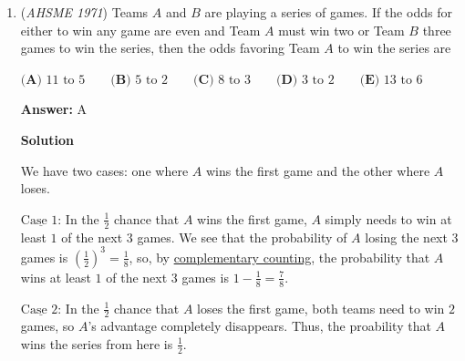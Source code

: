 \begin{enumerate}
 



\textbf{Solution 2 (not recommended)}

Suppose $w=e^{i\frac{2\pi}3}=\cos(\frac{2\pi}3)+i\sin(\frac{2\pi}3) = \frac{-1+i\sqrt3}2$. Substituting this into the given expression, we can calculate the result:\begin{align*}(1-w+w^2)(1+w-w^2) &= (1-\frac{-1+i\sqrt3}2+(\frac{-1+i\sqrt3}2)^2)(1+\frac{-1+i\sqrt3}2-(\frac{-1+i\sqrt3}2)^2) \\&= (1-\frac{-1+i\sqrt3}{2}+\frac{1-3-2i\sqrt3}{4})(1+\frac{-1+i\sqrt3}2-\frac{1-3-2i\sqrt3}{4}) \\&= (1-\frac{-1+i\sqrt3}{2}+\frac{-1-i\sqrt3}{2})(1+\frac{-1+i\sqrt3}2-\frac{-1-i\sqrt3}{2}) \\&= (1-2(\frac{i\sqrt3}2))(1+2(\frac{i\sqrt3}2)) \\&= 1^2-(i\sqrt3)^2 \\&= 1+3 \\&= 4\end{align*}
Thus, our answer is $\boxed{\textbf{(A) }4}$.

 


	\item (\textit{AHSME 1971}) Teams $A$ and $B$ are playing a series of games. If the odds for either to win any game are even and 
Team $A$ must win two or Team $B$ three games to win the series, then the odds favoring Team $A$ to win the series are


 $\textbf{(A) }11\text{ to }5\qquad \textbf{(B) }5\text{ to }2\qquad \textbf{(C) }8\text{ to }3\qquad \textbf{(D) }3\text{ to }2\qquad \textbf{(E) }13\text{ to }6$

 \textbf{Answer: }A



\textbf{Solution}

We have two cases: one where $A$ wins the first game and the other where $A$ loses.

 $\underline{\text{Case 1:}}$ In the $\frac12$ chance that $A$ wins the first game, $A$ simply needs to win at least $1$ of the next $3$ games. We see that the probability of $A$ losing the next $3$ games is $(\frac12)^3=\frac18$, so, by \href{https://artofproblemsolving.com/wiki/index.php?title=Complementary\_counting}{complementary counting}, the probability that $A$ wins at least $1$ of the next $3$ games is $1-\frac18=\frac78$.

 $\underline{\text{Case 2:}}$ In the $\frac12$ chance that $A$ loses the first game, both teams need to win $2$ games, so $A$'s advantage completely disappears. Thus, the proability that $A$ wins the series from here is $\frac12$.


\end{enumerate}
